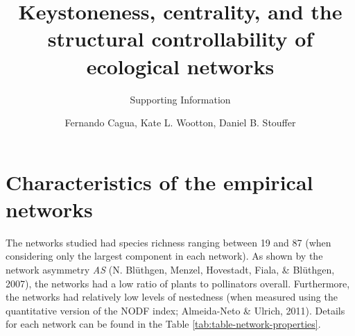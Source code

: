 \documentclass[a4paper]{artikel1}
\title{Keystoneness, centrality, and the structural controllability of
ecological networks}
\subtitle{Supporting Information}
\author{Fernando Cagua, Kate L. Wootton, Daniel B. Stouffer}
\date{}
\theoremstyle{definition}
\theoremstyle{definition}
\theoremstyle{definition}
\theoremstyle{remark}
\begin{document}
\maketitle

\renewcommand\thefigure{S\arabic{figure}}    

\setcounter{figure}{0}

\renewcommand\thetable{S\arabic{table}}    

\setcounter{table}{0}

\renewcommand{\thesection}{S\arabic{section}}

\setcounter{section}{0}

\doublespacing

\section{Characteristics of the empirical
networks}\label{empirical-networks}

The networks studied had species richness ranging between 19 and 87
(when considering only the largest component in each network). As shown
by the network asymmetry \emph{AS} (N. Blüthgen, Menzel, Hovestadt,
Fiala, \& Blüthgen, 2007), the networks had a low ratio of plants to
pollinators overall. Furthermore, the networks had relatively low levels
of nestedness (when measured using the quantitative version of the NODF
index; Almeida-Neto \& Ulrich, 2011). Details for each network can be
found in the Table \ref{tab:table-network-properties}.
\end{document}
